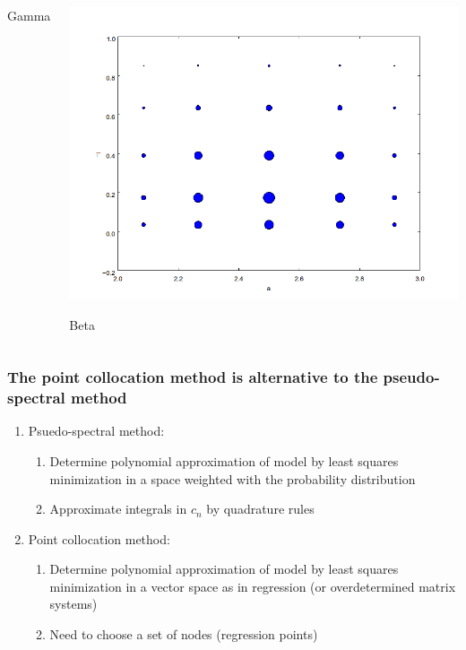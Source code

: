 \documentclass{beamer}
\begin{document}
\begin{frame}
\begin{columns}
\begin{center}
                Gamma
     \end{center}

     \begin{center}
                \includegraphics[width=.7\textwidth]{nodes_beta.png}

                Beta
     \end{center}
 \end{columns}
\end{frame}


%

 \begin{frame}
  \frametitle{The point collocation method is alternative to the
  pseudo-spectral method}

\begin{enumerate}[<+->]
\item Psuedo-spectral method:
\begin{enumerate}[<+->]
\item Determine polynomial approximation of model by least squares
minimization in a space weighted with the probability distribution
\item Approximate integrals in $c_n$ by quadrature rules
\end{enumerate}
\item Point collocation method:
\begin{enumerate}[<+->]
\item Determine polynomial approximation of model by least squares
minimization in a vector space as in regression (or overdetermined matrix systems)
\item Need to choose a set of nodes (regression points)
\end{enumerate}
\end{enumerate}
\end{frame}
\end{document}
